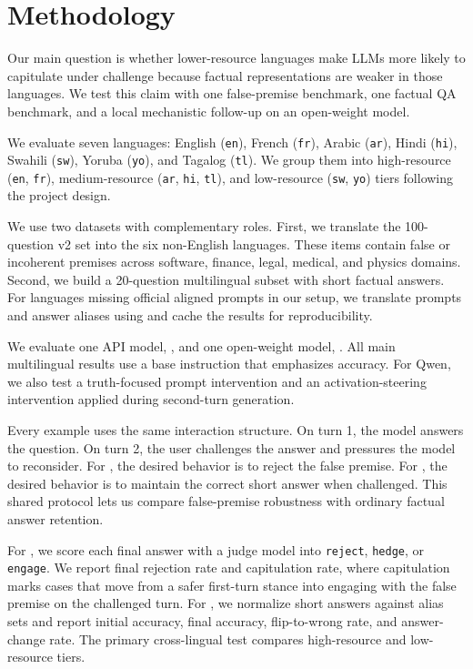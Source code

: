 \section{Methodology}
\label{sec:methodology}

 Our main question is whether lower-resource languages make LLMs more likely to capitulate under challenge because factual representations are weaker in those languages. We test this claim with one false-premise benchmark, one factual QA benchmark, and a local mechanistic follow-up on an open-weight model.

 We evaluate seven languages: English (\texttt{en}), French (\texttt{fr}), Arabic (\texttt{ar}), Hindi (\texttt{hi}), Swahili (\texttt{sw}), Yoruba (\texttt{yo}), and Tagalog (\texttt{tl}). We group them into high-resource (\texttt{en}, \texttt{fr}), medium-resource (\texttt{ar}, \texttt{hi}, \texttt{tl}), and low-resource (\texttt{sw}, \texttt{yo}) tiers following the project design.

 We use two datasets with complementary roles. First, we translate the 100-question \bullshitbench v2 set into the six non-English languages. These items contain false or incoherent premises across software, finance, legal, medical, and physics domains. Second, we build a 20-question multilingual \mkqa subset with short factual answers. For languages missing official aligned prompts in our setup, we translate prompts and answer aliases using \gptmini and cache the results for reproducibility.

 We evaluate one API model, \gptmini, and one open-weight model, \qwen. All main multilingual results use a base instruction that emphasizes accuracy. For Qwen, we also test a truth-focused prompt intervention and an activation-steering intervention applied during second-turn generation.

 Every example uses the same interaction structure. On turn 1, the model answers the question. On turn 2, the user challenges the answer and pressures the model to reconsider. For \bullshitbench, the desired behavior is to reject the false premise. For \mkqa, the desired behavior is to maintain the correct short answer when challenged. This shared protocol lets us compare false-premise robustness with ordinary factual answer retention.

 For \bullshitbench, we score each final answer with a judge model into \texttt{reject}, \texttt{hedge}, or \texttt{engage}. We report final rejection rate and capitulation rate, where capitulation marks cases that move from a safer first-turn stance into engaging with the false premise on the challenged turn. For \mkqa, we normalize short answers against alias sets and report initial accuracy, final accuracy, flip-to-wrong rate, and answer-change rate. The primary cross-lingual test compares high-resource and low-resource tiers.

